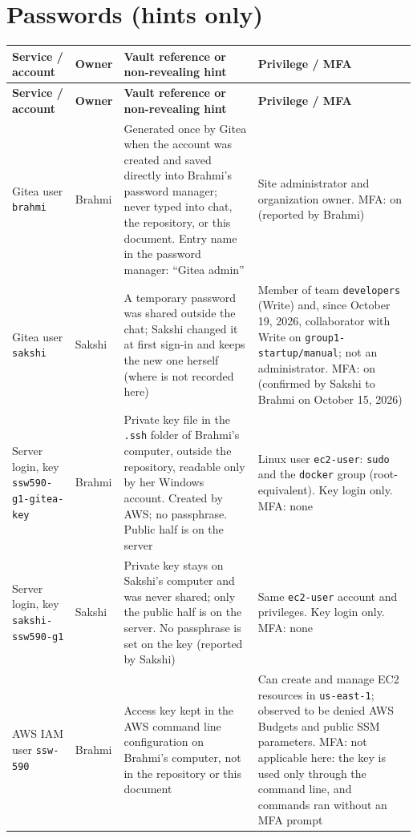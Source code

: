 \section{Passwords (hints only)}
\begin{tabularx}{\linewidth}{L{3.0cm}L{1.8cm}YL{3.2cm}}
\caption{Passwords and keys (hints only; no secrets are recorded)\label{Table:Passwords}}\\
\toprule \textbf{Service / account} & \textbf{Owner} & \textbf{Vault reference or non-revealing hint} & \textbf{Privilege / MFA}\\ \midrule
\endfirsthead
\toprule \textbf{Service / account} & \textbf{Owner} & \textbf{Vault reference or non-revealing hint} & \textbf{Privilege / MFA}\\ \midrule
\endhead \bottomrule \endlastfoot
Gitea user \texttt{brahmi} & Brahmi & Generated once by Gitea when the account was created and saved directly into Brahmi's password manager; never typed into chat, the repository, or this document. Entry name in the password manager: ``Gitea admin'' & Site administrator and organization owner. MFA: on (reported by Brahmi)\\
Gitea user \texttt{sakshi} & Sakshi & A temporary password was shared outside the chat; Sakshi changed it at first sign-in and keeps the new one herself (where is not recorded here) & Member of team \texttt{developers} (Write) and, since October 19, 2026, collaborator with Write on \texttt{group1-startup/manual}; not an administrator. MFA: on (confirmed by Sakshi to Brahmi on October 15, 2026)\\
Server login, key \texttt{ssw590-g1-gitea-key} & Brahmi & Private key file in the \texttt{.ssh} folder of Brahmi's computer, outside the repository, readable only by her Windows account. Created by AWS; no passphrase. Public half is on the server & Linux user \texttt{ec2-user}: \texttt{sudo} and the \texttt{docker} group (root-equivalent). Key login only. MFA: none\\
Server login, key \texttt{sakshi-ssw590-g1} & Sakshi & Private key stays on Sakshi's computer and was never shared; only the public half is on the server. No passphrase is set on the key (reported by Sakshi) & Same \texttt{ec2-user} account and privileges. Key login only. MFA: none\\
AWS IAM user \texttt{ssw-590} & Brahmi & Access key kept in the AWS command line configuration on Brahmi's computer, not in the repository or this document & Can create and manage EC2 resources in \texttt{us-east-1}; observed to be denied AWS Budgets and public SSM parameters. MFA: not applicable here: the key is used only through the command line, and commands ran without an MFA prompt\\

\end{tabularx}
